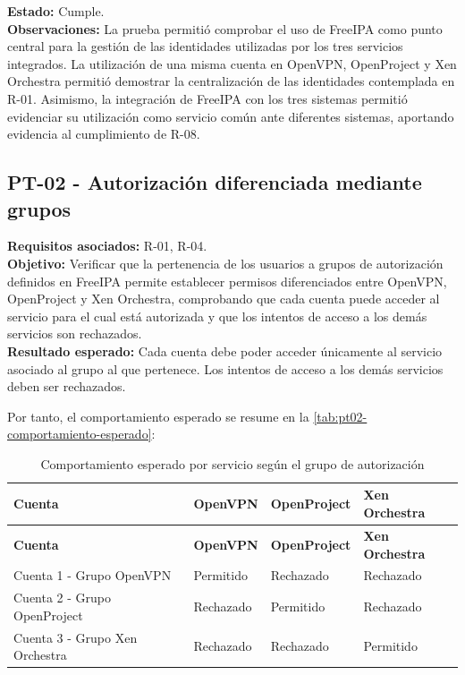 \textbf{Estado:} Cumple.\\
\textbf{Observaciones:} La prueba permitió comprobar el uso de FreeIPA como punto central para la gestión de las identidades utilizadas por los tres servicios integrados. La utilización de una misma cuenta en OpenVPN, OpenProject y Xen Orchestra permitió demostrar la centralización de las identidades contemplada en R-01.
Asimismo, la integración de FreeIPA con los tres sistemas permitió evidenciar su utilización como servicio común ante diferentes sistemas, aportando evidencia al cumplimiento de R-08.

\subsection{PT-02 - Autorización diferenciada mediante grupos}\label{subsec:pt02}
\textbf{Requisitos asociados:} R-01, R-04.\\
\textbf{Objetivo:} Verificar que la pertenencia de los usuarios a grupos de autorización definidos en FreeIPA permite establecer permisos diferenciados entre OpenVPN, OpenProject y Xen Orchestra, comprobando que cada cuenta puede acceder al servicio para el cual está autorizada y que los intentos de acceso a los demás servicios son rechazados.\\
\textbf{Resultado esperado:} Cada cuenta debe poder acceder únicamente al servicio asociado al grupo al que pertenece. Los intentos de acceso a los demás servicios deben ser rechazados.

Por tanto, el comportamiento esperado se resume en la \autoref{tab:pt02-comportamiento-esperado}:

\begingroup
\fontsize{8.5pt}{9.5pt}\selectfont
\renewcommand{\arraystretch}{1.3}
\setlength{\tabcolsep}{4pt}

\begin{longtable}{|
	>{\raggedright\arraybackslash}p{4.5cm}|
	>{\raggedright\arraybackslash}p{3.0cm}|
	>{\raggedright\arraybackslash}p{3.0cm}|
	>{\raggedright\arraybackslash}p{3.0cm}|}

	\caption{Comportamiento esperado por servicio según el grupo de autorización}
	\label{tab:pt02-comportamiento-esperado}
	\\
	\hline
	\rowcolor[gray]{0.85}
	\textbf{Cuenta}                &
	\textbf{OpenVPN}               &
	\textbf{OpenProject}           &
	\textbf{Xen Orchestra}
	\\
	\hline
	\endfirsthead

	\hline
	\rowcolor[gray]{0.85}
	\textbf{Cuenta}                &
	\textbf{OpenVPN}               &
	\textbf{OpenProject}           &
	\textbf{Xen Orchestra}
	\\
	\hline
	\endhead

	Cuenta 1 - Grupo OpenVPN       & Permitido & Rechazado & Rechazado \\ \hline
	Cuenta 2 - Grupo OpenProject   & Rechazado & Permitido & Rechazado \\ \hline
	Cuenta 3 - Grupo Xen Orchestra & Rechazado & Rechazado & Permitido \\ \hline
\end{longtable}
\endgroup
\normalsize

